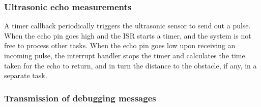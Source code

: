\subsubsection*{Ultrasonic echo measurements}

A timer callback periodically triggers the ultrasonic sensor to send out a pulse.
When the echo pin goes high and the ISR starts a timer, and the system is not free to process other tasks.
When the echo pin goes low upon receiving an incoming pulse, the interrupt handler stops the timer and calculates the time taken for the echo to return, and in turn the distance to the obstacle, if any, in a separate task.

\subsubsection*{Transmission of debugging messages}
